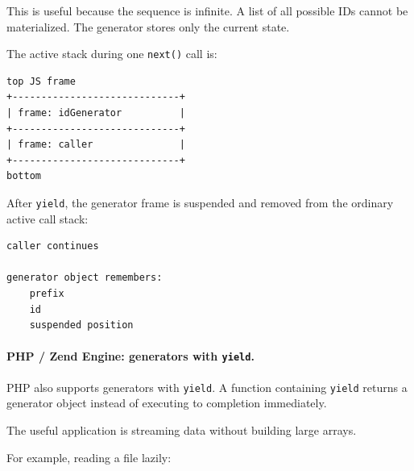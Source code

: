 This is useful because the sequence is infinite. A list of all possible IDs cannot be materialized. The generator stores only the current state.

The active stack during one \texttt{next()} call is:

\begin{verbatim}
top JS frame
+-----------------------------+
| frame: idGenerator          |
+-----------------------------+
| frame: caller               |
+-----------------------------+
bottom
\end{verbatim}

After \texttt{yield}, the generator frame is suspended and removed from the ordinary active call stack:

\begin{verbatim}
caller continues

generator object remembers:
    prefix
    id
    suspended position
\end{verbatim}

\paragraph{PHP / Zend Engine: generators with \texttt{yield}.}

PHP also supports generators with \texttt{yield}. A function containing \texttt{yield} returns a generator object instead of executing to completion immediately.



The useful application is streaming data without building large arrays.

For example, reading a file lazily:



